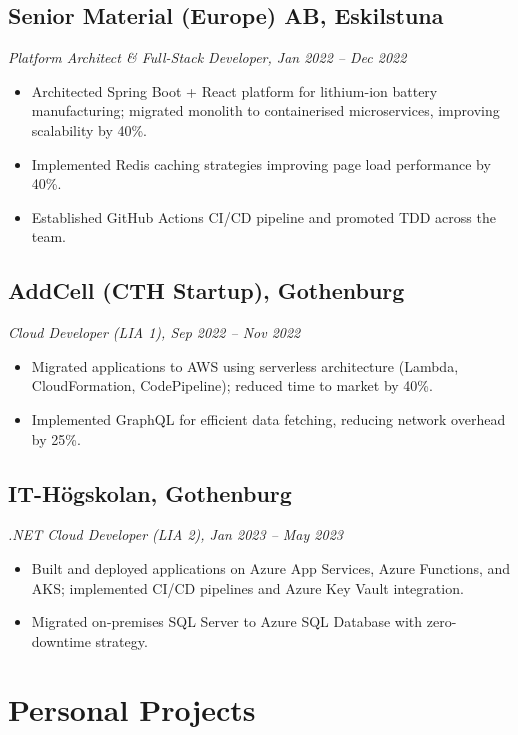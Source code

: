 \documentclass[a4paper,10pt]{article}
\begin{document}
\subsection*{Senior Material (Europe) AB, Eskilstuna}
\textit{Platform Architect \& Full-Stack Developer, Jan 2022 -- Dec 2022}
\begin{itemize}[noitemsep]
  \item Architected Spring Boot + React platform for lithium-ion battery manufacturing;
        migrated monolith to containerised microservices, improving scalability by 40\%.
  \item Implemented Redis caching strategies improving page load performance by 40\%.
  \item Established GitHub Actions CI/CD pipeline and promoted TDD across the team.
\end{itemize}

\subsection*{AddCell (CTH Startup), Gothenburg}
\textit{Cloud Developer (LIA 1), Sep 2022 -- Nov 2022}
\begin{itemize}[noitemsep]
  \item Migrated applications to AWS using serverless architecture (Lambda, CloudFormation,
        CodePipeline); reduced time to market by 40\%.
  \item Implemented GraphQL for efficient data fetching, reducing network overhead by 25\%.
\end{itemize}

\subsection*{IT-Högskolan, Gothenburg}
\textit{.NET Cloud Developer (LIA 2), Jan 2023 -- May 2023}
\begin{itemize}[noitemsep]
  \item Built and deployed applications on Azure App Services, Azure Functions, and AKS;
        implemented CI/CD pipelines and Azure Key Vault integration.
  \item Migrated on-premises SQL Server to Azure SQL Database with zero-downtime strategy.
\end{itemize}

\section*{Personal Projects}
\end{document}
